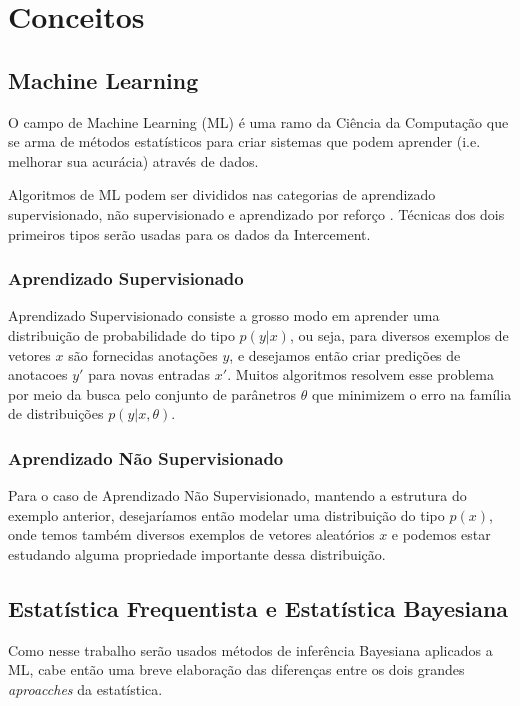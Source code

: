 \chapter{Conceitos}
\label{cap:conceitos}


\section{Machine Learning}

O campo de Machine Learning (ML) é uma ramo da Ciência da Computação que se arma de métodos estatísticos para criar sistemas que podem aprender (i.e. melhorar sua acurácia) através de dados.

Algoritmos de ML podem ser divididos nas categorias de aprendizado supervisionado, não supervisionado e aprendizado por reforço \citep{dlbook}. Técnicas dos dois primeiros tipos serão usadas para os dados da Intercement.

\subsection{Aprendizado Supervisionado}

Aprendizado Supervisionado consiste a grosso modo em aprender uma distribuição de probabilidade do tipo $p(y | x)$, ou seja, para diversos exemplos de vetores $x$ são fornecidas anotações $y$, e desejamos então criar predições de anotacoes $y'$ para novas entradas $x'$. Muitos algoritmos resolvem esse problema por meio da busca pelo conjunto de parânetros $\theta$ que minimizem o erro na família de distribuições $p(y | x,\theta)$.

\subsection{Aprendizado Não Supervisionado}

Para o caso de Aprendizado Não Supervisionado, mantendo a estrutura do exemplo anterior, desejaríamos então modelar uma distribuição do tipo $p(x)$, onde temos também diversos exemplos de vetores aleatórios $x$ e podemos estar estudando alguma propriedade importante dessa distribuição.

\section{Estatística Frequentista e Estatística Bayesiana}

Como nesse trabalho serão usados métodos de inferência Bayesiana aplicados a ML, cabe então uma breve elaboração das diferenças entre os dois grandes \textit{aproacches} da estatística.\\

